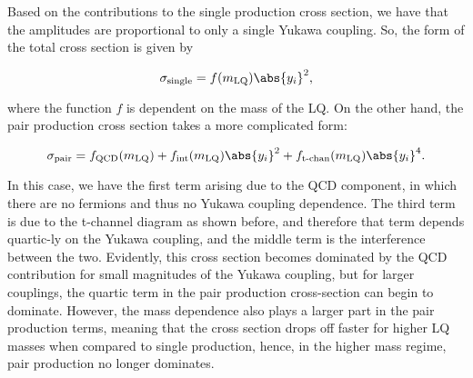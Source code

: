             Based on the contributions to the single production cross section, we have that the amplitudes are proportional to only a single Yukawa coupling. So, the form of the total cross section is given by

            \begin{equation}
                \sigma_{\text{single}} = f(m_{\text{LQ}}) \abs{y_i}^2,
            \end{equation}

            where the function $f$ is dependent on the mass of the LQ. On the other hand, the pair production cross section takes a more complicated form:

            \begin{equation}
                \sigma_{\text{pair}} = f_{\text{QCD}}(m_{\text{LQ}}) + f_{\text{int}}(m_{\text{LQ}}) \abs{y_i}^2 + f_{\text{t-chan}}(m_{\text{LQ}}) \abs{y_i}^4. 
            \end{equation}

            In this case, we have the first term arising due to the QCD component, in which there are no fermions and thus no Yukawa coupling dependence. The third term is due to the t-channel diagram as shown before, and therefore that term depends quartic-ly on the Yukawa coupling, and the middle term is the interference between the two. Evidently, this cross section becomes dominated by the QCD contribution for small magnitudes of the Yukawa coupling, but for larger couplings, the quartic term in the pair production cross-section can begin to dominate. However, the mass dependence also plays a larger part in the pair production terms, meaning that the cross section drops off faster for higher LQ masses when compared to single production, hence, in the higher mass regime, pair production no longer dominates.
